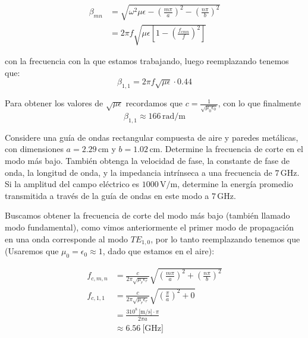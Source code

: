 \documentclass[
  11pt,
  letterpaper,
   addpoints,
   answers
  ]{exam}
\begin{document}
\begin{questions}
\begin{solution}
\begin{align}
    \beta_{mn} &= \sqrt{\omega^2 \mu \epsilon - \left(\frac{m\pi}{a}\right)^2 - \left(\frac{n\pi}{b}\right)^2} \tag{79} \\
    &= 2\pi f \sqrt{\mu \epsilon \left[ 1 - \left(\frac{f_{cmn}}{f}\right)^2 \right]} \tag{80}
\end{align}

con la frecuencia con la que estamos trabajando, luego reemplazando tenemos que:
\begin{equation}
    \beta_{1,1} = 2\pi f \sqrt{\mu\epsilon} \cdot 0.44 \tag{81}
\end{equation}

Para obtener los valores de $\sqrt{\mu\epsilon}$ recordamos que $c = \frac{1}{\sqrt{\mu_0 \epsilon_0}}$, con lo que finalmente
\begin{equation}
    \beta_{1,1} \approx 166\,\mathrm{rad}/\mathrm{m} \tag{82}
\end{equation}
\end{solution}
\question Considere una guía de ondas rectangular compuesta de aire y paredes metálicas, con dimensiones $a = 2.29\,\text{cm}$ y $b = 1.02\,\text{cm}$. Determine la frecuencia de corte en el modo más bajo. También obtenga la velocidad de fase, la constante de fase de onda, la longitud de onda, y la impedancia intrínseca a una frecuencia de $7\,\text{GHz}$. Si la amplitud del campo eléctrico es $1000\,\text{V/m}$, determine la energía promedio transmitida a través de la guía de ondas en este modo a $7\,\text{GHz}$.

\begin{solution}
    Buscamos obtener la frecuencia de corte del modo más bajo (también llamado modo fundamental), como vimos anteriormente el primer modo de propagación en una onda corresponde al modo $TE_{1,0}$, por lo tanto reemplazando tenemos que (Usaremos que $\mu_0 = \epsilon_0 \approx 1$, dado que estamos en el aire):

\begin{align}
    f_{c,m,n} &= \frac{c}{2\pi\sqrt{\mu_r \epsilon_r}} \sqrt{\left( \frac{m\pi}{a} \right)^2 + \left( \frac{n\pi}{b} \right)^2} \tag{83} \\
    f_{c,1,1} &= \frac{c}{2\pi\sqrt{\mu_r \epsilon_r}} \sqrt{\left( \frac{\pi}{a} \right)^2 + 0} \tag{84} \\
    &= \frac{310^8\ \text{[m/s]} \cdot \pi}{2\pi a} \tag{85} \\
    &\approx 6.56\ \text{[GHz]} \tag{86}
\end{align}


\end{solution}
\end{questions}
\end{document}

